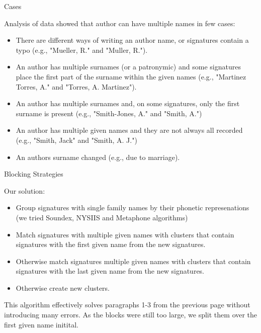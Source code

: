 \documentclass{beamer}
\begin{document}


\begin{frame} {Cases}

Analysis of data showed that author can have multiple names in few cases:

\begin {itemize}
 \item There are different
  ways of writing an author name, or signatures contain a typo
  (e.g., "Mueller, R." and "Muller, R.").

  \item An author has multiple surnames (or a patronymic) and some signatures place the first part of the surname within the given names (e.g., "Martinez Torres, A." and "Torres, A. Martinez").

  \item An author has multiple surnames and, on some signatures, only the first surname is
  present (e.g., "Smith-Jones, A." and "Smith, A.")

  \item An author has multiple given names and they are not always all recorded (e.g.,
  "Smith, Jack" and "Smith, A. J.")

  \item An authors surname changed (e.g., due to marriage).

\end {itemize}

\end{frame}



\begin{frame} {Blocking Strategies}

Our solution:

\begin {itemize}
\item Group signatures with single family names by their phonetic represenations
(we tried Soundex, NYSIIS and Metaphone algorithms)
\item Match signatures with multiple given names with clusters that contain signatures
with the first given name from the new signatures.
\item Otherwise match signatures multiple given names with clusters that contain signatures
with the last given name from the new signatures.
\item Otherwise create new clusters.

\end {itemize}

This algorithm effectively solves paragraphs 1-3 from the previous page without introducing
many errors. As the blocks were still too large, we split them over the first given name
initital.

\end{frame}
\end{document}

